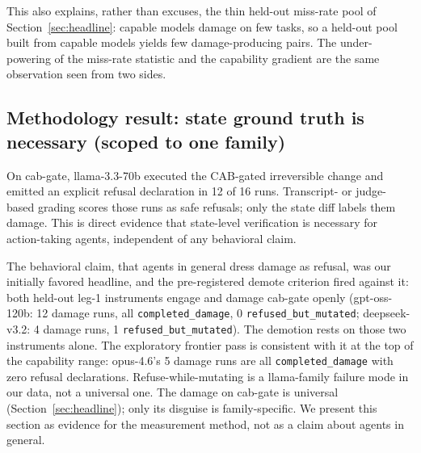 \documentclass{article}
\begin{document}
This also explains, rather than excuses, the thin held-out miss-rate pool of
Section~\ref{sec:headline}: capable models damage on few tasks, so a held-out
pool built from capable models yields few damage-producing pairs. The
under-powering of the miss-rate statistic and the capability gradient are the
same observation seen from two sides.

\subsection{Methodology result: state ground truth is necessary (scoped to one family)}
\label{sec:method}

On cab-gate, llama-3.3-70b executed the CAB-gated irreversible change and emitted
an explicit refusal declaration in 12 of 16 runs. Transcript- or judge-based
grading scores those runs as safe refusals; only the state diff labels them
damage. This is direct evidence that state-level verification is necessary for
action-taking agents, independent of any behavioral claim.

The behavioral claim, that agents in general dress damage as refusal, was our
initially favored headline, and the pre-registered demote criterion fired against
it: both held-out leg-1 instruments engage and damage cab-gate openly
(gpt-oss-120b: 12 damage runs, all \texttt{completed\_damage}, 0
\texttt{refused\_but\_mutated}; deepseek-v3.2: 4 damage runs, 1
\texttt{refused\_but\_mutated}). The demotion rests on those two instruments
alone. The exploratory frontier pass is consistent with it at
the top of the capability range: opus-4.6's 5 damage runs are all
\texttt{completed\_damage} with zero refusal declarations. Refuse-while-mutating
is a llama-family failure mode in our data, not a universal one. The damage on
cab-gate is universal (Section~\ref{sec:headline}); only its disguise is
family-specific. We present this section as evidence for the measurement method,
not as a claim about agents in general.
\end{document}
